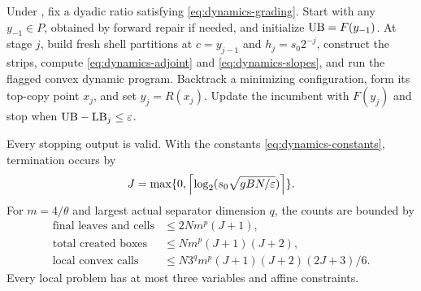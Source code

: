 \begin{theorem}
\label{thm:dynamics}
Under , fix a dyadic ratio satisfying
\eqref{eq:dynamics-grading}. Start with any $y_{-1}\in P$, obtained by
forward repair if needed, and initialize $\mathrm{UB}=F(y_{-1})$. At stage $j$,
build fresh shell partitions at
$c=y_{j-1}$ and $h_j=s_0 2^{-j}$, construct the strips, compute
\eqref{eq:dynamics-adjoint} and \eqref{eq:dynamics-slopes}, and run the
flagged convex dynamic program. Backtrack a minimizing configuration,
form its top-copy point $x_j$, and set $y_j=R(x_j)$. Update the incumbent
with $F(y_j)$ and stop when $\mathrm{UB}-\mathrm{LB}_j\le\varepsilon$.

Every stopping output is valid. With the constants
\eqref{eq:dynamics-constants}, termination occurs by
\begin{equation}\label{eq:dynamics-stage}
 J=\max\{0,\left\lceil \log_2(s_0\sqrt{gBN/\varepsilon})\right\rceil\}.
\end{equation}
For $m=4/\theta$ and largest actual separator dimension $q$, the counts
are bounded by
\begin{equation}\label{eq:dynamics-counts}
 \begin{aligned}
 \text{final leaves and cells}&\le2Nm^p(J+1),\\
 \text{total created boxes}&\le Nm^p(J+1)(J+2),\\
 \text{local convex calls}&\le
 N3^qm^p(J+1)(J+2)(2J+3)/6.
 \end{aligned}
\end{equation}
Every local problem has at most three variables and affine constraints.
\end{theorem}
